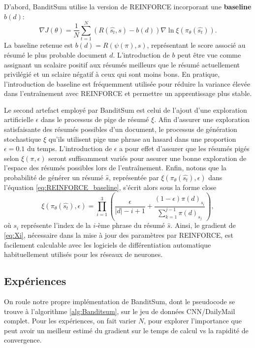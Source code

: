 D'abord, BanditSum utilise la version de REINFORCE incorporant une \textbf{baseline} $b(d)$:
\begin{equation}
    \nabla J(\theta) = \frac{1}{N} \sum_{t=1}^N\left(R(\hat{s_t}, s) - b(d)\right)\nabla \ln \xi\left(\pi_\theta (\hat{s_t})\right).
    \label{eq:REINFORCE_baseline}
\end{equation}
La baseline retenue est $b(d) = R\left(\psi(\pi), s\right)$, représentant le score associé au résumé
le plus probable document $d$.
L'introduction de $b$ peut être vue comme assignant un scalaire positif 
aux résumés meilleurs que le résumé actuellement privilégié et un sclaire négatif à ceux qui 
sont moins bons.
En pratique, l'introduction de baseline est fréquemment utilisée pour réduire la variance 
élevée dans l'entraînement avec REINFORCE et permettre un apprentissage plus stable.

Le second artefact employé par BanditSum est celui de l'ajout d'une exploration artificielle
$\epsilon$ dans le processus de pige de résumé $\xi$.
Afin d'assurer une exploration satisfaisante des résumés possibles d'un document, le processus 
de génération stochastique $\xi$ qu'ils utilisent pige une phrase au hasard dans une 
proportion $\epsilon=0.1$ du temps.
L'introduction de $\epsilon$ a pour effet d'assurer que les résumés pigés selon $\xi(\pi, \epsilon)$ seront 
suffisamment variés pour assurer une bonne exploration de l'espace des résumés possibles lors de
l'entraînement.
Enfin, notons que la probabilité de générer un résumé $\hat{s}$, représentée par
 $\xi \left(\pi_\theta(\hat{s_t}), \epsilon \right)$ dans l'équation
 \ref{eq:REINFORCE_baseline}, s'écrit alors sous la forme close
\begin{equation}
    \xi \left(\pi_\theta(\hat{s_t}), \epsilon \right) = \displaystyle \prod_{i=1}^3 \left(\dfrac{\epsilon}{|d| -i + 1}  + \dfrac{(1 - \epsilon)\pi(d)_{s_i}}{\sum_{k=1}^{j-1} \pi(d)_{s_j}}\right),
    \label{eq:Xi}
\end{equation}
où $s_i$ représente l'index de la $i$-ème phrase du résumé $\hat{s}$. 
Ainsi, le gradient de \eqref{eq:Xi}, nécessaire dans la mise à jour des paramètres 
par REINFORCE, est facilement calculable avec les logiciels de différentiation automatique
habituellement utilisés pour les réseaux de neurones.

\subsection{Expériences}

On roule notre propre implémentation de BanditSum, dont le pseudocode se trouve à l'algorithme 
\ref{alg:Banditsum}, sur le jeu de données CNN/DailyMail complet.
Pour les expériences, on fait varier $N$, pour explorer
l'importance que peut avoir un meilleur estimé du gradient sur le temps de calcul
vs la rapidité de convergence.

